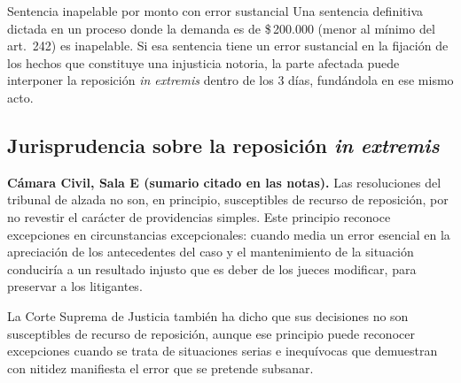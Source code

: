 \documentclass[12pt,oneside]{book}
\begin{document}
\begin{example}{Sentencia inapelable por monto con error sustancial}
Una sentencia definitiva dictada en un proceso donde la demanda es de \$\,200.000 (menor al mínimo del art.~242) es inapelable. Si esa sentencia tiene un error sustancial en la fijación de los hechos que constituye una injusticia notoria, la parte afectada puede interponer la reposición \textit{in extremis} dentro de los 3 días, fundándola en ese mismo acto.
\end{example}

\subsection{Jurisprudencia sobre la reposición \textit{in extremis}}

\begin{note}
\textbf{Cámara Civil, Sala E (sumario citado en las notas).} Las resoluciones del tribunal de alzada no son, en principio, susceptibles de recurso de reposición, por no revestir el carácter de providencias simples. Este principio reconoce excepciones en circunstancias excepcionales: cuando media un error esencial en la apreciación de los antecedentes del caso y el mantenimiento de la situación conduciría a un resultado injusto que es deber de los jueces modificar, para preservar a los litigantes.
\end{note}

La Corte Suprema de Justicia también ha dicho que sus decisiones no son susceptibles de recurso de reposición, aunque ese principio puede reconocer excepciones cuando se trata de situaciones serias e inequívocas que demuestran con nitidez manifiesta el error que se pretende subsanar.
\end{document}
